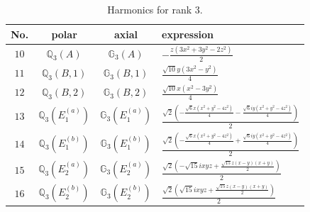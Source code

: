 \documentclass[fleqn,8pt,landscape]{jsarticle}
\begin{document}
\begin{table}[ht!]
\begin{center}
\caption{Harmonics for rank 3.}
\renewcommand{\arraystretch}{1.3}
\begin{tabular}{cccl} \hline \hline
No. & polar & axial & expression \\ \hline
$ 10 $ & $ \mathbb{Q}_{3}(A) $ & $ \mathbb{G}_{3}(A) $ & $ - \frac{z \left(3 x^{2} + 3 y^{2} - 2 z^{2}\right)}{2} $ \\
$ 11 $ & $ \mathbb{Q}_{3}(B,1) $ & $ \mathbb{G}_{3}(B,1) $ & $ \frac{\sqrt{10} y \left(3 x^{2} - y^{2}\right)}{4} $ \\
$ 12 $ & $ \mathbb{Q}_{3}(B,2) $ & $ \mathbb{G}_{3}(B,2) $ & $ \frac{\sqrt{10} x \left(x^{2} - 3 y^{2}\right)}{4} $ \\
$ 13 $ & $ \mathbb{Q}_{3}(E_{1}^{(a)}) $ & $ \mathbb{G}_{3}(E_{1}^{(a)}) $ & $ \frac{\sqrt{2} \left(- \frac{\sqrt{6} x \left(x^{2} + y^{2} - 4 z^{2}\right)}{4} - \frac{\sqrt{6} i y \left(x^{2} + y^{2} - 4 z^{2}\right)}{4}\right)}{2} $ \\
$ 14 $ & $ \mathbb{Q}_{3}(E_{1}^{(b)}) $ & $ \mathbb{G}_{3}(E_{1}^{(b)}) $ & $ \frac{\sqrt{2} \left(- \frac{\sqrt{6} x \left(x^{2} + y^{2} - 4 z^{2}\right)}{4} + \frac{\sqrt{6} i y \left(x^{2} + y^{2} - 4 z^{2}\right)}{4}\right)}{2} $ \\
$ 15 $ & $ \mathbb{Q}_{3}(E_{2}^{(a)}) $ & $ \mathbb{G}_{3}(E_{2}^{(a)}) $ & $ \frac{\sqrt{2} \left(- \sqrt{15} i x y z + \frac{\sqrt{15} z \left(x - y\right) \left(x + y\right)}{2}\right)}{2} $ \\
$ 16 $ & $ \mathbb{Q}_{3}(E_{2}^{(b)}) $ & $ \mathbb{G}_{3}(E_{2}^{(b)}) $ & $ \frac{\sqrt{2} \left(\sqrt{15} i x y z + \frac{\sqrt{15} z \left(x - y\right) \left(x + y\right)}{2}\right)}{2} $ \\
 \hline \hline
\end{tabular}
\end{center}
\end{table}
\end{document}
